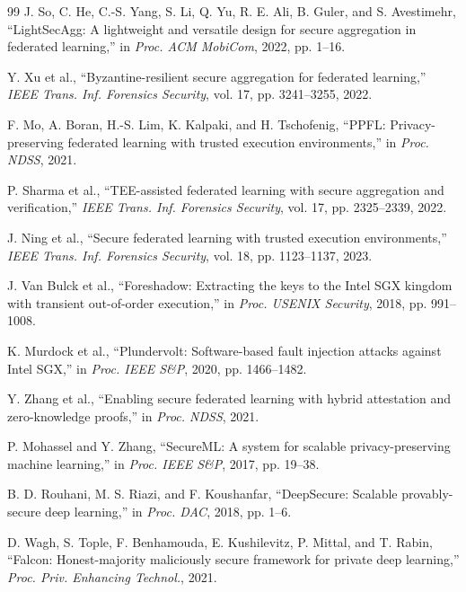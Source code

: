 \begin{thebibliography}{99}
J. So, C. He, C.-S. Yang, S. Li, Q. Yu, R. E. Ali, B. Guler, and S. Avestimehr, ``LightSecAgg: A lightweight and versatile design for secure aggregation in federated learning,'' in \textit{Proc. ACM MobiCom}, 2022, pp. 1--16.

Y. Xu et al., ``Byzantine-resilient secure aggregation for federated learning,'' \textit{IEEE Trans. Inf. Forensics Security}, vol. 17, pp. 3241--3255, 2022.

F. Mo, A. Boran, H.-S. Lim, K. Kalpaki, and H. Tschofenig, ``PPFL: Privacy-preserving federated learning with trusted execution environments,'' in \textit{Proc. NDSS}, 2021.

P. Sharma et al., ``TEE-assisted federated learning with secure aggregation and verification,'' \textit{IEEE Trans. Inf. Forensics Security}, vol. 17, pp. 2325--2339, 2022.

J. Ning et al., ``Secure federated learning with trusted execution environments,'' \textit{IEEE Trans. Inf. Forensics Security}, vol. 18, pp. 1123--1137, 2023.

J. Van Bulck et al., ``Foreshadow: Extracting the keys to the Intel SGX kingdom with transient out-of-order execution,'' in \textit{Proc. USENIX Security}, 2018, pp. 991--1008.

K. Murdock et al., ``Plundervolt: Software-based fault injection attacks against Intel SGX,'' in \textit{Proc. IEEE S\&P}, 2020, pp. 1466--1482.

Y. Zhang et al., ``Enabling secure federated learning with hybrid attestation and zero-knowledge proofs,'' in \textit{Proc. NDSS}, 2021.

P. Mohassel and Y. Zhang, ``SecureML: A system for scalable privacy-preserving machine learning,'' in \textit{Proc. IEEE S\&P}, 2017, pp. 19--38.

B. D. Rouhani, M. S. Riazi, and F. Koushanfar, ``DeepSecure: Scalable provably-secure deep learning,'' in \textit{Proc. DAC}, 2018, pp. 1--6.

D. Wagh, S. Tople, F. Benhamouda, E. Kushilevitz, P. Mittal, and T. Rabin, ``Falcon: Honest-majority maliciously secure framework for private deep learning,'' \textit{Proc. Priv. Enhancing Technol.}, 2021.


\end{thebibliography}
